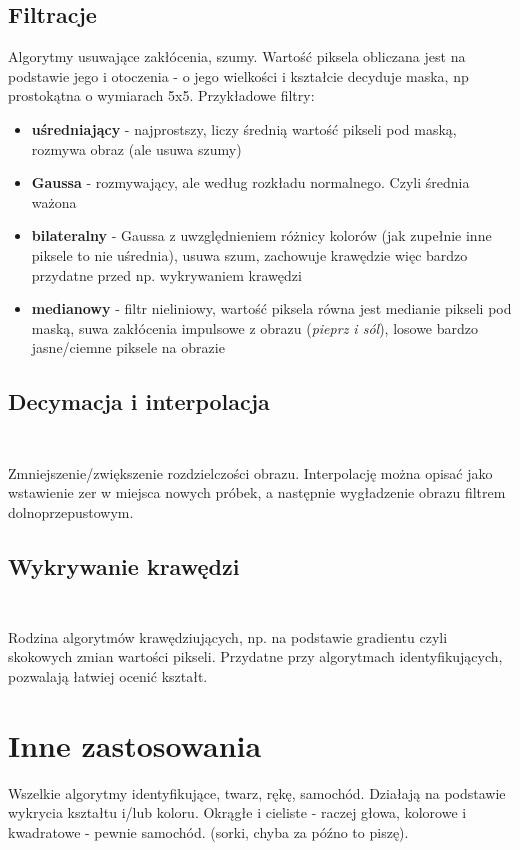 \documentclass[a4paper,twoside]{report}
\begin{document}
\subsection{Filtracje}
Algorytmy usuwające zakłócenia, szumy. Wartość piksela obliczana jest na podstawie jego i otoczenia - o jego wielkości i kształcie decyduje maska, np prostokątna o wymiarach 5x5. Przykładowe filtry:

\begin{itemize}
	\item \textbf{uśredniający} - najprostszy, liczy średnią wartość pikseli pod maską, rozmywa obraz (ale usuwa szumy)
	\item \textbf{Gaussa} - rozmywający, ale według rozkładu normalnego. Czyli średnia ważona
	\item \textbf{bilateralny} - Gaussa z uwzględnieniem różnicy kolorów (jak zupełnie inne piksele to nie uśrednia), usuwa szum, zachowuje krawędzie więc bardzo przydatne przed np. wykrywaniem krawędzi 
	\item \textbf{medianowy} - filtr nieliniowy, wartość piksela równa jest medianie pikseli pod maską, suwa zakłócenia impulsowe z obrazu (\textit{pieprz i sól}), losowe bardzo jasne/ciemne piksele na obrazie
\end{itemize}

\subsection{Decymacja i interpolacja\\\\}
Zmniejszenie/zwiększenie rozdzielczości obrazu. Interpolację można opisać jako wstawienie zer w miejsca nowych próbek, a następnie wygładzenie obrazu filtrem dolnoprzepustowym.

\subsection{Wykrywanie krawędzi\\\\}
Rodzina algorytmów krawędziujących, np. na podstawie gradientu czyli skokowych zmian wartości pikseli. Przydatne przy algorytmach identyfikujących, pozwalają łatwiej ocenić kształt.

\section{Inne zastosowania}
Wszelkie algorytmy identyfikujące, twarz, rękę, samochód. Działają na podstawie wykrycia kształtu i/lub koloru. Okrągłe i cieliste - raczej głowa, kolorowe i kwadratowe - pewnie samochód. (sorki, chyba za późno to piszę).
\end{document}
